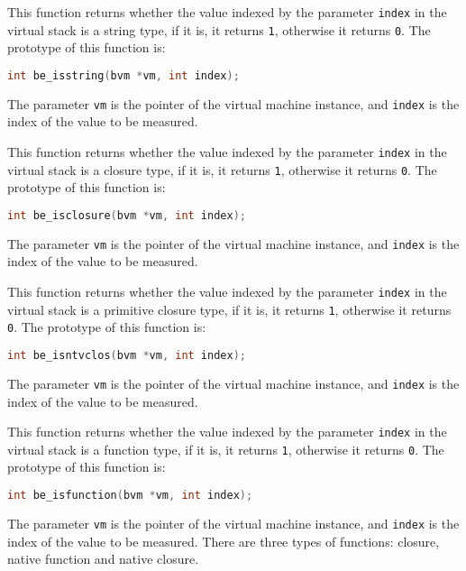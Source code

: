 
This function returns whether the value indexed by the parameter \texttt{index} in the virtual stack is a string type, if it is, it returns \texttt{1}, otherwise it returns \texttt{0}. The prototype of this function is:
\begin{lstlisting}[language=c, style=berry, numbers=none]
int be_isstring(bvm *vm, int index);
\end{lstlisting}
The parameter \texttt{vm} is the pointer of the virtual machine instance, and \texttt{index} is the index of the value to be measured.


This function returns whether the value indexed by the parameter \texttt{index} in the virtual stack is a closure type, if it is, it returns \texttt{1}, otherwise it returns \texttt{0}. The prototype of this function is:
\begin{lstlisting}[language=c, style=berry, numbers=none]
int be_isclosure(bvm *vm, int index);
\end{lstlisting}
The parameter \texttt{vm} is the pointer of the virtual machine instance, and \texttt{index} is the index of the value to be measured.


This function returns whether the value indexed by the parameter \texttt{index} in the virtual stack is a primitive closure type, if it is, it returns \texttt{1}, otherwise it returns \texttt{0}. The prototype of this function is:
\begin{lstlisting}[language=c, style=berry, numbers=none]
int be_isntvclos(bvm *vm, int index);
\end{lstlisting}
The parameter \texttt{vm} is the pointer of the virtual machine instance, and \texttt{index} is the index of the value to be measured.


This function returns whether the value indexed by the parameter \texttt{index} in the virtual stack is a function type, if it is, it returns \texttt{1}, otherwise it returns \texttt{0}. The prototype of this function is:
\begin{lstlisting}[language=c, style=berry, numbers=none]
int be_isfunction(bvm *vm, int index);
\end{lstlisting}
The parameter \texttt{vm} is the pointer of the virtual machine instance, and \texttt{index} is the index of the value to be measured. There are three types of functions: closure, native function and native closure.

